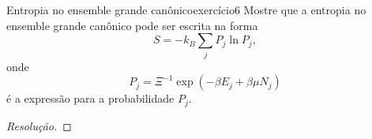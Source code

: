 \begin{exercício}{Entropia no ensemble grande canônico}{exercício6}
    Mostre que a entropia no ensemble grande canônico pode ser escrita na forma
    \begin{equation*}
        S = - k_B\sum_j P_j \ln{P_j},
    \end{equation*}
    onde
    \begin{equation*}
        P_j = \Xi^{-1} \exp\left(-\beta E_j + \beta \mu N_j\right)
    \end{equation*}
    é a expressão para a probabilidade \(P_j\).
\end{exercício}
\begin{proof}[Resolução]

\end{proof}
